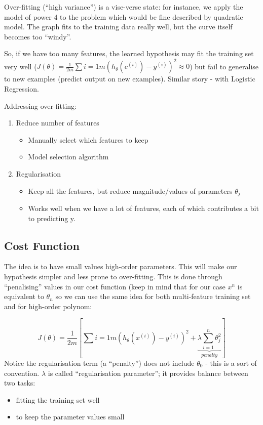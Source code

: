\documentclass{scrartcl}
\begin{document}
Over-fitting (``high variance'') is a vise-verse state: for instance,
we apply the model of power 4 to the problem which would be fine
described by quadratic model. The graph fits to the training data
really well, but the curve itself becomes too ``windy''.

So, if we have too many features, the learned hypothesis may fit the
training set very well ($J(\theta) = \frac{1}{2m} \sum
\limits{i=1}{m}(h_\theta(c^{(i)}) - y^{(i)})^2 \approx 0$) but fail to
generalise to new examples (predict output on new examples). Similar
story - with Logistic Regression.

Addressing over-fitting:
\begin{enumerate}
\item Reduce number of features
  \begin{itemize}
  \item Manually select which features to keep
  \item Model selection algorithm
  \end{itemize}
\item Regularisation
  \begin{itemize}
  \item Keep all the features, but reduce magnitude/values of
    parameters $\theta_j$
  \item Works well when we have a lot of features, each of which
    contributes a bit to predicting y.
  \end{itemize}
\end{enumerate}

\subsection{Cost Function}
\label{sec:7-2}
The idea is to have small values high-order parameters. This will make
our hypothesis simpler and less prone to over-fitting. This is done
through ``penalising'' values in our cost function (keep in mind that
for our case $x^n$ is equivalent to $\theta_n$ so we can use the same
idea for both multi-feature training set and for high-order polynom:

\[J(\theta) = \frac{1}{2m} \left[ \sum \limits{i=1}{m}
  (h_\theta(x^{(i)}) - y^{(i)})^2 + \underbrace{ \lambda \sum
    \limits_{i=1}^{n}\theta_j^2}_{penalty} \right] \] Notice the
regularisation term (a ``penalty'') does not include $\theta_0$ - this
is a sort of convention. $\lambda$ is called ``regularisation
parameter''; it provides balance between two tasks:
\begin{itemize}
\item fitting the training set well
\item to keep the parameter values small
\end{itemize}
\end{document}
